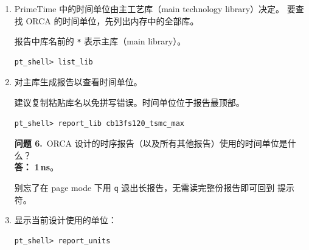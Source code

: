 \begin{enumerate}
\begin{noteBox}
以下是显示语法帮助的另一种方式：
\begin{lstlisting}
pt_shell> help -v restore_session
\end{lstlisting}
\end{noteBox}

\begin{questionBox}
\textbf{问题 5.}\ 根据上一条命令， 是否接受开关（switches）？\\[0.35em]
\textbf{答：} 是。它接受会话名等参数/开关，从而可指定恢复众多已保存会话中的哪一个。
\end{questionBox}

  \item PrimeTime 中的时间单位由主工艺库（main technology library）决定。
        要查找 ORCA 的时间单位，先列出内存中的全部库。

\begin{noteBox}
报告中库名前的 \texttt{*} 表示主库（main library）。
\end{noteBox}

\begin{lstlisting}
pt_shell> list_lib
\end{lstlisting}

  \item 对主库生成报告以查看时间单位。

\begin{noteBox}
建议复制粘贴库名以免拼写错误。时间单位位于报告最顶部。
\end{noteBox}

\begin{lstlisting}
pt_shell> report_lib cb13fs120_tsmc_max
\end{lstlisting}

\begin{questionBox}
\textbf{问题 6.}\ ORCA 设计的时序报告（以及所有其他报告）使用的时间单位是什么？\\[0.35em]
\textbf{答：} \textbf{1\,ns}。
\end{questionBox}

\begin{noteBox}
别忘了在 page mode 下用 \texttt{q} 退出长报告，无需读完整份报告即可回到  提示符。
\end{noteBox}

  \item 显示当前设计使用的单位：
\begin{lstlisting}
pt_shell> report_units
\end{lstlisting}
\end{enumerate}

